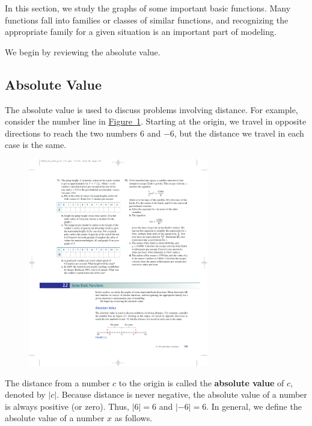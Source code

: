 \documentclass[10pt,]{book}
\newcommand{\terminology}[1]{\textbf{#1}}
\theoremstyle{plain}
\theoremstyle{definition}
\theoremstyle{definition}
\theoremstyle{definition}
\theoremstyle{definition}
\theoremstyle{definition}
\numberwithin{equation}{section}
\newcommand\abs[1]{\left|#1\right|}
\begin{document}
    In this section, we study the graphs of some important basic functions. Many functions fall into families or classes of similar functions, and recognizing the appropriate family for a given situation is an important part of modeling.
%
\par

    We begin by reviewing the absolute value.
%
\typeout{************************************************}
\typeout{************************************************}
\subsection[Absolute Value]{Absolute Value}\label{subsection-37}

    The absolute value is used to discuss problems involving distance. For example, consider the number line in \hyperref[fig-abs-six]{Figure~\ref{fig-abs-six}}. Starting at the origin, we travel in opposite directions to reach the two numbers \(6\) and \(−6\), but the distance we travel in each case is the same.
%
\leavevmode%
\begin{figure}
\centering
\includegraphics[width=0.70\textwidth,]{images/fig-abs-six.pdf}\caption{\label{fig-abs-six}}
\end{figure}
\par

    The distance from a number \(c\) to the origin is called the \terminology{absolute value} of \(c\), denoted by \(\abs{c}\). Because distance is never negative, the absolute value of a number is always positive (or zero). Thus, \(\abs{6}= 6\) and \(\abs{−6} = 6\). In general, we define the absolute value of a number \(x\) as follows.
%
\typeout{************************************************}
\typeout{************************************************}
\end{document}
